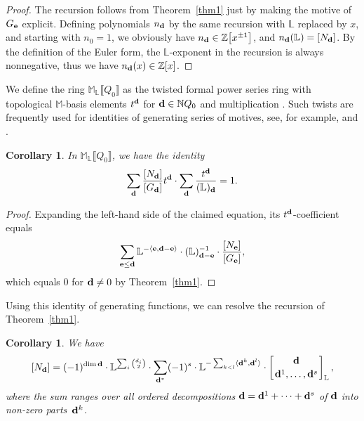 \documentclass[10pt,a4paper]{amsart}
\numberwithin{equation}{section}
\newtheorem{Corollary}[Theorem]{Corollary}
\theoremstyle{definition}
\begin{document}
\begin{proof} The recursion follows from Theorem~\ref{thm1} just by making the motive of $G_{\bf e}$ explicit. Defining polynomials $n_{\bf d}$ by the same recursion with $\mathbb{L}$ replaced by $x$, and starting with $n_0=1$, we obviously have $n_{\bf d}\in\mathbb{Z}\big[x^{\pm 1}\big]$, and $n_{\bf d}(\mathbb{L})=[N_{\bf d}]$. By the definition of the Euler form, the $\mathbb{L}$-exponent in the recursion is always nonnegative, thus we have $n_{\bf d}(x)\in\mathbb{Z}[x]$.\end{proof}

We define the ring $\mathbb{M}_\mathbb{L}\llbracket Q_0\rrbracket$ as the twisted formal power series ring with topological $\mathbb{M}$-basis elements $t^{\bf d}$ for ${\bf d}\in \mathbb{N}Q_0$ and multiplication
.
Such twists are frequently used for identities of generating series of motives, see, for example, \cite[Section~2.1]{MozIntro} and \cite[Definition~3.2]{RCounting}.

\begin{Corollary}\label{gfi} In $\mathbb{M}_\mathbb{L}\llbracket Q_0\rrbracket$, we have the identity
\[\sum_{\bf d}\frac{[N_{\bf d}]}{[G_{\bf d}]}t^{\bf d}\cdot\sum_{\bf d}\frac{t^{\bf d}}{(\mathbb{L})_{\bf d}}=1.\]
\end{Corollary}

\begin{proof} Expanding the left-hand side of the claimed equation, its $t^{\bf d}$-coefficient equals
\[\sum_{{\bf e}\leq{\bf d}}\mathbb{L}^{-\langle{\bf e},{\bf d}-{\bf e}\rangle}\cdot(\mathbb{L})_{{\bf d}-{\bf e}}^{-1}\cdot\frac{[N_{\bf e}]}{[G_{\bf e}]},\]
which equals $0$ for ${\bf d}\not=0$ by Theorem~\ref{thm1}.\end{proof}

Using this identity of generating functions, we can resolve the recursion of Theorem~\ref{thm1}.

\begin{Corollary}\label{resolved} We have
\[[N_{\bf d}]=(-1)^{\dim {\bf d}}\cdot\mathbb{L}^{\sum_i{d_i\choose 2}}\cdot\sum_{{\bf d}^*}(-1)^s\cdot\mathbb{L}^{-\sum_{k<l}\langle{\bf d}^k,{\bf d}^l\rangle}\cdot\left[{{\bf d}\atop{{\bf d}^1,\dots,{\bf d}^s}}\right]_\mathbb{L},\]
where the sum ranges over all ordered decompositions ${\bf d}={\bf d}^1+\dots+{\bf d}^s$ of ${\bf d}$ into non-zero parts~${\bf d}^k$.
\end{Corollary}
\end{document}
